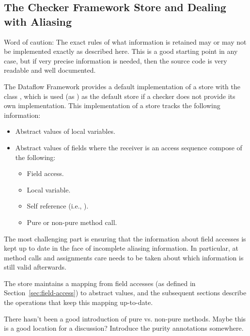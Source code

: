 \subsection{The Checker Framework Store and Dealing with Aliasing}

\begin{workinprogress}
    Word of caution: The exact rules of what information is
        retained may or may not be implemented exactly as described
        here.  This is a good starting point in any case, but if very
        precise information is needed, then the source code is very
        readable and well documented.
\end{workinprogress}

The Dataflow Framework provides a default implementation of a store
with the class , which is used (as
) as the default store if a checker does not provide its
own implementation.  This implementation of a store tracks the
following information:

\begin{itemize}
    \item Abstract values of local variables.
    \item Abstract values of fields where the receiver is an
          access sequence compose of the following:
    \begin{itemize}
    \item Field access.
    \item Local variable.
    \item Self reference (i.e., ).
    \item Pure or non-pure method call.
    \end{itemize}
\end{itemize}

The most challenging part is ensuring that the information about field
accesses is kept up to date in the face of incomplete aliasing
information.  In particular, at method calls and assignments care
needs to be taken about which information is still valid afterwards.

The store maintains a mapping from field accesses (as defined in
Section~\ref{sec:field-access}) to abstract values, and the subsequent
sections describe the operations that keep this mapping up-to-date.

\begin{workinprogress}
  There hasn't been a good introduction of pure vs. non-pure methods.
  Maybe this is a good location for a discussion?
  Introduce the purity annotations somewhere.
\end{workinprogress}


